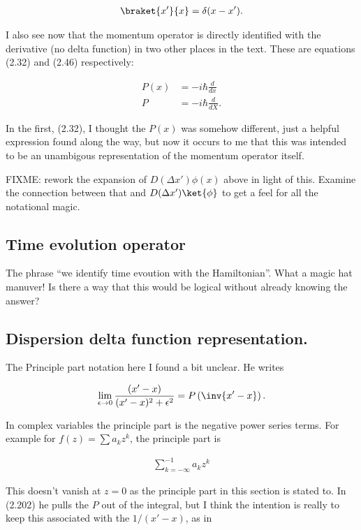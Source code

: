\begin{align*}
\braket{x'}{x} = \delta(x-x').
\end{align*}

I also see now that the momentum operator is directly identified with the derivative (no delta function) in two other places in the text.  These are equations (2.32) and (2.46) respectively:

\begin{align*}
P(x) &= -i \hbar \frac{d}{dx} \\
P &= -i \hbar \frac{d}{dX}.
\end{align*}

In the first, (2.32), I thought the $P(x)$ was somehow different, just a helpful expression found along the way, but now it occurs to me that this was intended to be an unambigous representation of the momentum operator itself.

FIXME: rework the expansion of $D(\Delta x') \phi(x)$ above in light of this.  Examine the connection between that and 
$D(\Delta x') \ket{\phi}$ to get a feel for all the notational magic.

\subsection{Time evolution operator}

The phrase ``we identify time evoution with the Hamiltonian''.  What a magic hat manuver!  Is there a way that this would be logical without already knowing the answer?

\subsection{Dispersion delta function representation.}

The Principle part notation here I found a bit unclear.  He writes

\begin{align*}
\lim_{\epsilon \rightarrow 0} 
\frac{(x'-x)}{(x'-x)^2 + \epsilon^2}
= 
P\left( \inv{x' - x} \right).
\end{align*}

In complex variables the principle part is the negative power series terms.  For example for $f(z) = \sum a_k z^k$, the principle part is

\begin{align*}
\sum_{k = -\infty}^{-1} a_k z^k
\end{align*}

This doesn't vanish at $z = 0$ as the principle part in this section is stated to.  In (2.202) he pulls the $P$ out of the integral, but I think the intention is really to keep this associated with the $1/(x'-x)$, as in

